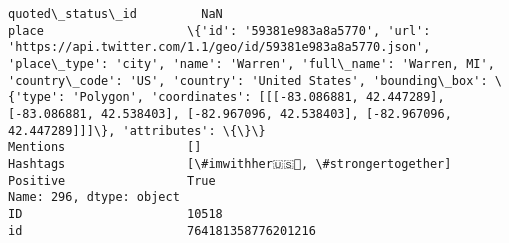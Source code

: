 \documentclass[11pt]{article}
\begin{document}
\begin{Verbatim}[commandchars=\\\{\}]
quoted\_status\_id         NaN                                                                                                                                                                                                                                                                                                                                                                                             
place                    \{'id': '59381e983a8a5770', 'url': 'https://api.twitter.com/1.1/geo/id/59381e983a8a5770.json', 'place\_type': 'city', 'name': 'Warren', 'full\_name': 'Warren, MI', 'country\_code': 'US', 'country': 'United States', 'bounding\_box': \{'type': 'Polygon', 'coordinates': [[[-83.086881, 42.447289], [-83.086881, 42.538403], [-82.967096, 42.538403], [-82.967096, 42.447289]]]\}, 'attributes': \{\}\}
Mentions                 []                                                                                                                                                                                                                                                                                                                                                                                              
Hashtags                 [\#imwithher🇺🇸👠, \#strongertogether]                                                                                                                                                                                                                                                                                                                                                              
Positive                 True                                                                                                                                                                                                                                                                                                                                                                                            
Name: 296, dtype: object
ID                       10518                                                                                                                                                                                                                                                                                                                                                                                               
id                       764181358776201216                                                                                                                                                                                                                                                                                                                                                                                  

\end{Verbatim}
\end{document}
